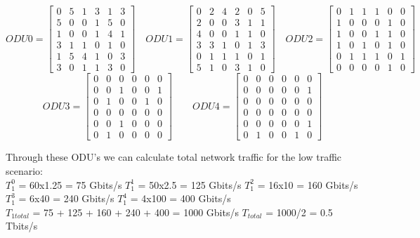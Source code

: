 \[
ODU0=
  \begin{bmatrix}
    0 & 5 & 1 & 3 & 1 & 3 \\
    5 & 0 & 0 & 1 & 5 & 0 \\
    1 & 0 & 0 & 1 & 4 & 1 \\
    3 & 1 & 1 & 0 & 1 & 0 \\
    1 & 5 & 4 & 1 & 0 & 3 \\
    3 & 0 & 1 & 1 & 3 & 0
  \end{bmatrix}
\quad ODU1=
  \begin{bmatrix}
    0 & 2 & 4 & 2 & 0 & 5 \\
    2 & 0 & 0 & 3 & 1 & 1 \\
    4 & 0 & 0 & 1 & 1 & 0 \\
    3 & 3 & 1 & 0 & 1 & 3 \\
    0 & 1 & 1 & 1 & 0 & 1 \\
    5 & 1 & 0 & 3 & 1 & 0
  \end{bmatrix}
\quad ODU2=
  \begin{bmatrix}
    0 & 1 & 1 & 1 & 0 & 0 \\
    1 & 0 & 0 & 0 & 1 & 0 \\
    1 & 0 & 0 & 1 & 1 & 0 \\
    1 & 0 & 1 & 0 & 1 & 0 \\
    0 & 1 & 1 & 1 & 0 & 1 \\
    0 & 0 & 0 & 0 & 1 & 0
  \end{bmatrix}
\]
\[
ODU3=
  \begin{bmatrix}
    0 & 0 & 0 & 0 & 0 & 0 \\
    0 & 0 & 1 & 0 & 0 & 1 \\
    0 & 1 & 0 & 0 & 1 & 0 \\
    0 & 0 & 0 & 0 & 0 & 0 \\
    0 & 0 & 1 & 0 & 0 & 0 \\
    0 & 1 & 0 & 0 & 0 & 0
  \end{bmatrix}
\qquad ODU4=
  \begin{bmatrix}
    0 & 0 & 0 & 0 & 0 & 0 \\
    0 & 0 & 0 & 0 & 0 & 1 \\
    0 & 0 & 0 & 0 & 0 & 0 \\
    0 & 0 & 0 & 0 & 0 & 0 \\
    0 & 0 & 0 & 0 & 0 & 1 \\
    0 & 1 & 0 & 0 & 1 & 0
  \end{bmatrix}
\]

Through these ODU's we can calculate total network traffic for the low traffic scenario:\\
$T_1^0$ = 60x1.25 = 75 Gbits/s \qquad
$T_1^1$ = 50x2.5 = 125 Gbits/s \qquad
$T_1^2$ = 16x10 = 160 Gbits/s \\
$T_1^3$ = 6x40 = 240 Gbits/s \quad
$T_1^4$ = 4x100 = 400 Gbits/s \\
$T_{1total}$ = 75 + 125 + 160 + 240 + 400 = 1000 Gbits/s \qquad
$T_{total}$ = 1000/2 = 0.5 Tbits/s\\


